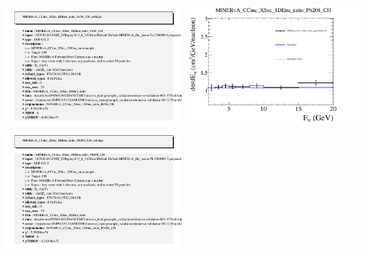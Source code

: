 \documentclass{article}
\begin{document}
\includegraphics[width=0.49\textwidth]{figures/nuisance_MINERvA_CCinc_XSec_1DEnu_ratio_Fe56_CH_info.png}
\centering
\includegraphics[width=0.49\textwidth]{figures/nuisance_MINERvA_CCinc_XSec_1DEnu_ratio_Pb208_CH_comp.png}
\includegraphics[width=0.49\textwidth]{figures/nuisance_MINERvA_CCinc_XSec_1DEnu_ratio_Pb208_CH_info.png}
\end{document}

